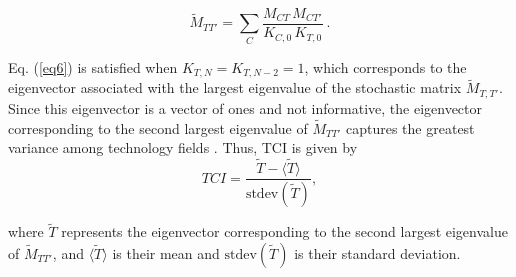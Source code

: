 \begin{equation} \label{eq7}
\widetilde{M}_{TT'} = \sum_{C} \frac{M_{CT}\, M_{CT'}}{K_{C,0}\, K_{T,0}}~.
\end{equation}

Eq. (\ref{eq6}) is satisfied when  \(K_{T,N} = K_{T,N-2} = 1\), which corresponds to the eigenvector associated with the largest eigenvalue of the stochastic matrix \(\widetilde{M}_{T,T'}\). 
Since this eigenvector is a vector of ones and not informative, the eigenvector corresponding to the second largest eigenvalue of \(\widetilde{M}_{TT'}\) captures the greatest variance among technology fields \cite{Hidalgo2021, Mealy2019}.
Thus, TCI is given by
\begin{equation} \label{eq8}
TCI = \frac{\widetilde{T} - \langle \widetilde{T} \rangle}{\text{stdev}(\widetilde{T})},
\end{equation}

where \(\widetilde{T}\) represents the eigenvector corresponding to the second largest eigenvalue of \(\widetilde{M}_{TT'}\), and \(\langle \widetilde{T} \rangle\) is their mean and \(\text{stdev}(\widetilde{T})\) is their standard deviation.
